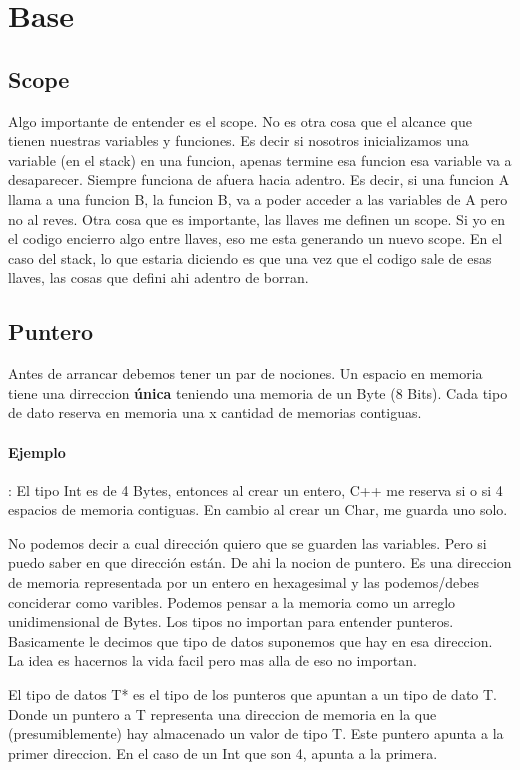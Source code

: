 \documentclass[11pt]{article}
\begin{document}
\tableofcontents
\section{Base}
\subsection{Scope}
Algo importante de entender es el scope.
No es otra cosa que el alcance que tienen nuestras variables y funciones.
Es decir si nosotros inicializamos una variable (en el stack) en una funcion,
apenas termine esa funcion esa variable va a desaparecer.
Siempre funciona de afuera hacia adentro.
Es decir, si una funcion A llama a una funcion B, la funcion B, va a poder
acceder a las variables de A pero no al reves.
Otra cosa que es importante, las llaves {}  me definen un scope.
Si yo en el codigo encierro algo entre llaves, eso me esta generando un nuevo scope.
En el caso del stack, lo que estaria diciendo es que una vez que el codigo sale
de esas llaves, las cosas que defini ahi adentro de borran.


\subsection{Puntero}
Antes de arrancar debemos tener un par de nociones.
Un espacio en memoria tiene una dirreccion \textbf{\'unica}
teniendo una memoria de un Byte (8 Bits).
Cada tipo de dato reserva en memoria una x cantidad de memorias contiguas.

\paragraph{Ejemplo}: El tipo Int es de 4 Bytes, entonces al crear un entero, C++
me reserva si o si 4 espacios de memoria contiguas.
En cambio al crear un Char, me guarda uno solo.
\vspace{.5cm}

No podemos decir a cual dirección quiero que se guarden las variables.
Pero si puedo saber en que dirección están.
De ahi la nocion de puntero.
 Es una direccion de memoria representada por un entero en
hexagesimal y las podemos/debes conciderar como varibles.
Podemos pensar a la memoria como un arreglo unidimensional de Bytes.
Los tipos no importan para entender punteros.
Basicamente le decimos que tipo de datos suponemos que hay en esa direccion.
La idea es hacernos la vida facil pero mas alla de eso no importan.

El tipo de datos T* es el tipo de los punteros que apuntan a un tipo de dato T.
Donde un puntero a T representa una direccion de memoria en la que
(presumiblemente) hay almacenado un valor de tipo T.
Este puntero apunta a la primer direccion.
En el caso de un Int que son 4, apunta a la primera.
\end{document}
